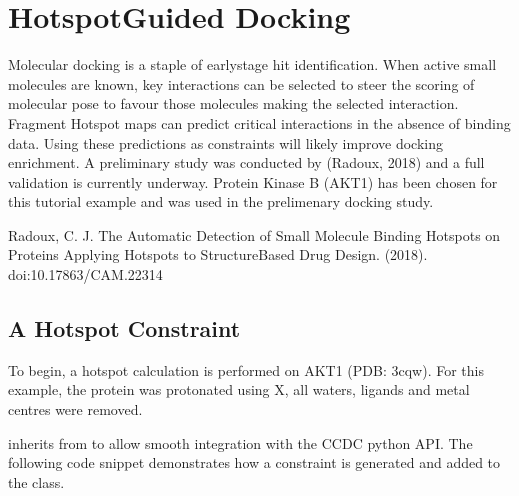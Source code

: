 \documentclass[letterpaper,10pt,english]{sphinxmanual}
\begin{document}
\noindent{}


\section{Hotspot\sphinxhyphen{}Guided Docking}
\label{\detokenize{tutorial:hotspot-guided-docking}}
Molecular docking is a staple of early\sphinxhyphen{}stage hit identification. When active small molecules are known,
key interactions can be selected to steer the scoring of molecular pose to favour those molecules making the selected
interaction. Fragment Hotspot maps can predict critical interactions in the absence of binding data. Using these
predictions as constraints will likely improve docking enrichment. A preliminary study was conducted by (Radoux, 2018)
and a full validation is currently underway. Protein Kinase B (AKT1) has been chosen for this tutorial example and was
used in the prelimenary docking study.

Radoux, C. J. The Automatic Detection of Small Molecule Binding Hotspots on Proteins Applying Hotspots
to Structure\sphinxhyphen{}Based Drug Design. (2018). doi:10.17863/CAM.22314


\subsection{A Hotspot Constraint}
\label{\detokenize{tutorial:a-hotspot-constraint}}
To begin, a hotspot calculation is performed on AKT1 (PDB: 3cqw). For this example, the protein was
protonated using X, all waters, ligands and metal centres were removed.

 inherits from  to allow smooth integration with the
CCDC python API. The following code snippet demonstrates how a constraint is generated and added to the
 class.
\end{document}
